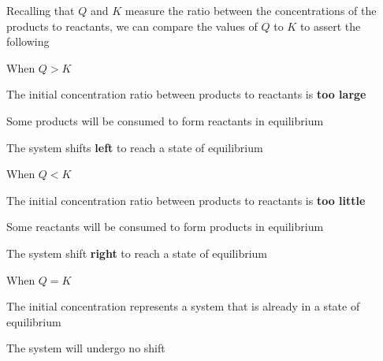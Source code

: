 Recalling that $Q$ and $K$ measure the ratio between the concentrations of the products to reactants,
we can compare the values of $Q$ to $K$ to assert the following
\begin{bulleted-list}
    \item When $Q>K$
        \begin{bulleted-list}
            \item The initial concentration ratio between products to reactants is \textbf{too large}
            \item Some products will be consumed to form reactants in equilibrium
            \item The system shifts \textbf{left} to reach a state of equilibrium
        \end{bulleted-list}
    \item When $Q<K$
        \begin{bulleted-list}
            \item The initial concentration ratio between products to reactants is \textbf{too little}
            \item Some reactants will be consumed to form products in equilibrium
            \item The system shift \textbf{right} to reach a state of equilibrium
        \end{bulleted-list}
    \item When $Q=K$
        \begin{bulleted-list}
            \item The initial concentration represents a system that is already in a state of
                equilibrium
            \item The system will undergo no shift
        \end{bulleted-list}
\end{bulleted-list}

